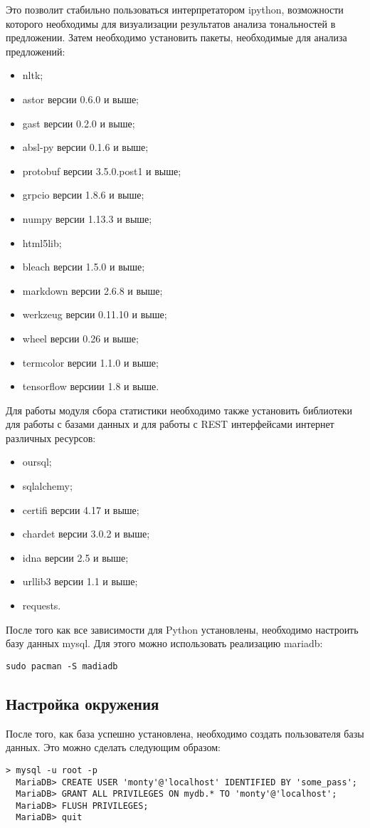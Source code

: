 Это позволит стабильно пользоваться интерпретатором ipython, возможности которого необходимы для визуализации результатов анализа тональностей в предложении. Затем необходимо установить пакеты, необходимые для анализа предложений:
\begin{itemize}
\item nltk;
\item astor версии 0.6.0 и выше;
\item gast версии 0.2.0 и выше;
\item absl-py версии 0.1.6 и выше;
\item protobuf версии 3.5.0.post1 и выше;
\item grpcio версии 1.8.6 и выше;
\item numpy версии 1.13.3 и выше;
\item html5lib;
\item bleach версии 1.5.0 и выше;
\item markdown версии 2.6.8 и выше;
\item werkzeug версии 0.11.10 и выше;
\item wheel версии 0.26 и выше;
\item termcolor версии 1.1.0 и выше;
\item tensorflow версиии 1.8 и выше.
\end{itemize}

Для работы модуля сбора статистики необходимо также установить библиотеки для работы с базами данных и для работы с REST интерфейсами интернет различных ресурсов:
\begin{itemize}
\item oursql;
\item sqlalchemy;
\item certifi версии 4.17 и выше;
\item chardet версии 3.0.2 и выше;
\item idna версии 2.5 и выше;
\item urllib3 версии 1.1 и выше;
\item requests.
\end{itemize}

После того как все зависимости для Python установлены, необходимо настроить базу данных mysql. Для этого можно использовать реализацию mariadb:
\medskip
\begin{lstlisting}[style=Python]
  sudo pacman -S madiadb
\end{lstlisting}
\medskip

\subsection{Настройка окружения}
После того, как база успешно установлена, необходимо создать пользователя базы данных. Это можно сделать следующим образом:
\medskip
\begin{lstlisting}[style=Python]
  > mysql -u root -p
  MariaDB> CREATE USER 'monty'@'localhost' IDENTIFIED BY 'some_pass';
  MariaDB> GRANT ALL PRIVILEGES ON mydb.* TO 'monty'@'localhost';
  MariaDB> FLUSH PRIVILEGES;
  MariaDB> quit
\end{lstlisting}
\medskip

